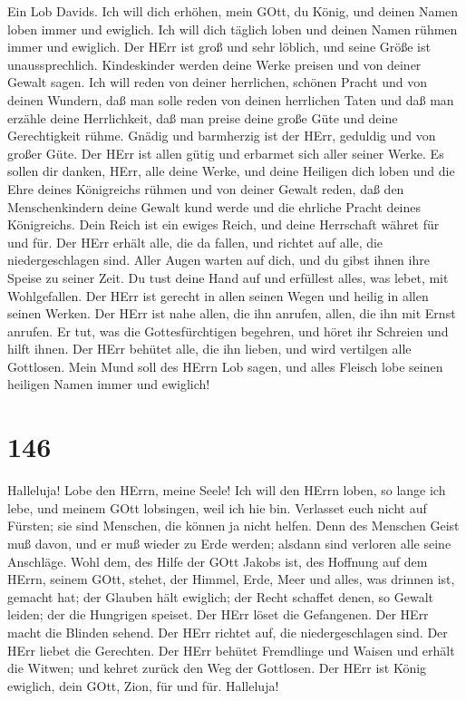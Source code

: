  Ein Lob Davids. Ich will dich erhöhen, mein GOtt, du König,
und deinen Namen loben immer und ewiglich.  Ich will dich
täglich loben und deinen Namen rühmen immer und ewiglich. 
Der HErr ist groß und sehr löblich, und seine Größe ist unaussprechlich.
 Kindeskinder werden deine Werke preisen und von deiner
Gewalt sagen.  Ich will reden von deiner herrlichen, schönen
Pracht und von deinen Wundern,  daß man solle reden von
deinen herrlichen Taten und daß man erzähle deine Herrlichkeit,
 daß man preise deine große Güte und deine Gerechtigkeit
rühme.  Gnädig und barmherzig ist der HErr, geduldig und von
großer Güte.  Der HErr ist allen gütig und erbarmet sich
aller seiner Werke.  Es sollen dir danken, HErr, alle deine
Werke, und deine Heiligen dich loben  und die Ehre deines
Königreichs rühmen und von deiner Gewalt reden,  daß den
Menschenkindern deine Gewalt kund werde und die ehrliche Pracht deines
Königreichs.  Dein Reich ist ein ewiges Reich, und deine
Herrschaft währet für und für.  Der HErr erhält alle, die
da fallen, und richtet auf alle, die niedergeschlagen sind.
 Aller Augen warten auf dich, und du gibst ihnen ihre
Speise zu seiner Zeit.  Du tust deine Hand auf und
erfüllest alles, was lebet, mit Wohlgefallen.  Der HErr ist
gerecht in allen seinen Wegen und heilig in allen seinen Werken.
 Der HErr ist nahe allen, die ihn anrufen, allen, die ihn
mit Ernst anrufen.  Er tut, was die Gottesfürchtigen
begehren, und höret ihr Schreien und hilft ihnen.  Der HErr
behütet alle, die ihn lieben, und wird vertilgen alle Gottlosen.
 Mein Mund soll des HErrn Lob sagen, und alles Fleisch lobe
seinen heiligen Namen immer und ewiglich!

\hypertarget{section-145}{%
\section{146}\label{section-145}}

 Halleluja! Lobe den HErrn, meine Seele!  Ich
will den HErrn loben, so lange ich lebe, und meinem GOtt lobsingen, weil
ich hie bin.  Verlasset euch nicht auf Fürsten; sie sind
Menschen, die können ja nicht helfen.  Denn des Menschen
Geist muß davon, und er muß wieder zu Erde werden; alsdann sind verloren
alle seine Anschläge.  Wohl dem, des Hilfe der GOtt Jakobs
ist, des Hoffnung auf dem HErrn, seinem GOtt, stehet,  der
Himmel, Erde, Meer und alles, was drinnen ist, gemacht hat; der Glauben
hält ewiglich;  der Recht schaffet denen, so Gewalt leiden;
der die Hungrigen speiset. Der HErr löset die Gefangenen. 
Der HErr macht die Blinden sehend. Der HErr richtet auf, die
niedergeschlagen sind. Der HErr liebet die Gerechten.  Der
HErr behütet Fremdlinge und Waisen und erhält die Witwen; und kehret
zurück den Weg der Gottlosen.  Der HErr ist König ewiglich,
dein GOtt, Zion, für und für. Halleluja!

